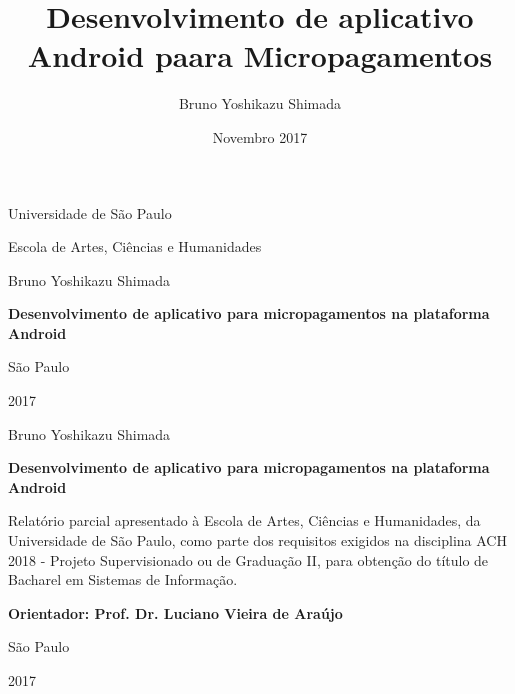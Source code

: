 \documentclass[hidelinks,12pt]{article}
\author{Bruno Yoshikazu Shimada}
\title{\textbf{Desenvolvimento de aplicativo Android paara Micropagamentos}
	}
\date{Novembro 2017}
\begin{document}
\begin{titlepage}
	\centering
	{\Large Universidade de S\~ao Paulo\par}
	{\Large Escola de Artes, Ci\^encias e Humanidades\par}
	\vfill
	{\Large Bruno Yoshikazu Shimada\par}
	\vspace{1cm}
	{\Large\bfseries Desenvolvimento de aplicativo para micropagamentos na plataforma Android\par}
	\vfill
	{\Large S\~ao Paulo\par}
	{\Large 2017\par}
\end{titlepage}
\newpage
\begin{titlepage}
	\centering
	{\Large Bruno Yoshikazu Shimada\par}
	\vspace{2cm}
	{\Large\bfseries Desenvolvimento de aplicativo para micropagamentos na plataforma Android\par}
	\vfill
	\begin{flushright}
		Relat\'orio parcial apresentado \`a Escola de Artes, Ci\^encias e Humanidades, da Universidade de S\~ao Paulo, como parte dos requisitos exigidos na disciplina ACH 2018 - Projeto Supervisionado ou de Gradua\c{c}\~ao II, para obten\c{c}\~ao do t\'itulo de Bacharel em Sistemas de Informa\c{c}\~ao.
		
		\bfseries Orientador: Prof. Dr. Luciano Vieira de Ara\'ujo
	\end{flushright}
	\vspace{2cm}
	{\Large S\~ao Paulo\par}
	{\Large 2017\par}
\end{titlepage}
\newpage
\end{document}
